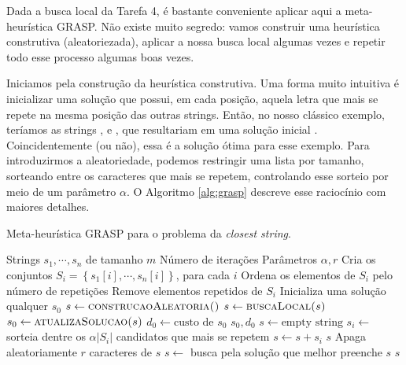 Dada a busca local da Tarefa 4, é bastante conveniente aplicar aqui a meta-heurística GRASP. Não existe muito segredo: vamos construir uma heurística construtiva (aleatoriezada), aplicar a nossa busca local algumas vezes e repetir todo esse processo algumas boas vezes.

Iniciamos pela construção da heurística construtiva. Uma forma muito intuitiva é inicializar uma solução que possui, em cada posição, aquela letra que mais se repete na mesma posição das outras strings. Então, no nosso clássico exemplo, teríamos as strings
,  e ,
que resultariam em uma solução inicial . Coincidentemente (ou não), essa é a solução ótima para esse exemplo.
Para introduzirmos a aleatoriedade, podemos restringir uma lista por tamanho, sorteando entre os caracteres que mais se repetem, controlando esse sorteio por meio de um parâmetro $\alpha$. O Algoritmo \ref{alg:grasp} descreve esse raciocínio com maiores detalhes.

\begin{algorithm}
    \caption{Meta-heurística GRASP para o problema da \textit{closest string}.}
    \label{alg:grasp}
    \begin{algorithmic}
        \Require Strings $s_1, \cdots, s_n$ de tamanho $m$
        \Require Número de iterações
        \Require Parâmetros $\alpha, r$
        \State Cria os conjuntos $S_i = \left\{s_1[i], \cdots, s_n[i]\right\}$, para cada $i$
        \State Ordena os elementos de $S_i$ pelo número de repetições
        \State Remove elementos repetidos de $S_i$
        \State Inicializa uma solução qualquer $s_0$
            \State $s \gets \textsc{construcaoAleatoria()}$
            \State $s \gets \textsc{buscaLocal($s$)}$
            \State $s_0 \gets \textsc{atualizaSolucao($s$)}$
        \EndFor
        \State $d_0 \gets \text{custo de } s_0$
        \State \Return $s_0, d_0$
        \State
            \State $s \gets \text{empty string}$
                \State $s_i \gets$ sorteia dentre os $\alpha|S_i|$ candidatos que mais se repetem
                \State $s \gets s + s_i$
            \EndFor
            \State \Return $s$
        \EndProcedure
        \State
            \State Apaga aleatoriamente $r$ caracteres de $s$
            \State $s \gets$ busca pela solução que melhor preenche $s$ 
            \State \Return $s$
        \EndProcedure
    \end{algorithmic}
\end{algorithm}

